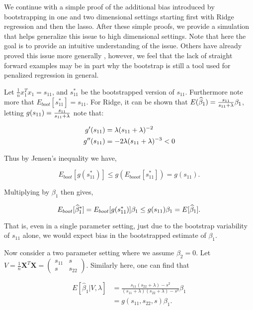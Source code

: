 We continue with a simple proof of the additional bias introduced by bootstrapping in one and two dimensional settings starting first with Ridge regression and then the lasso. After these simple proofs, we provide a simulation that helps generalize this issue to high dimensional settings. Note that here the goal is to provide an intuitive understanding of the issue. Others have already proved this issue more generally \citep{karoui2016, clarté2024}, however, we feel that the lack of straight forward examples may be in part why the bootstrap is still a tool used for penalized regression in general.

Let $\frac{1}{n}x_1^Tx_1 = s_{11}$, and $s_{11}^*$ be the bootstrapped version of $s_{11}$. Furthermore note more that $E_{boot}[s_{11}^*] = s_{11}$. For Ridge, it can be shown that $E(\widehat{\beta}_1) = \frac{s_{11}}{s_{11} + \lambda}\beta_1$, letting $g(s_{11}) = \frac{s_{11}}{s_{11} + \lambda}$ note that:

$$
\begin{aligned}
g'(s_{11}) &= \lambda (s_{11} + \lambda)^{-2} \\
g''(s_{11}) &= -2\lambda (s_{11} + \lambda)^{-3} < 0
\end{aligned}
$$

\noindent Thus by Jensen's inequality we have,

$$
E_{boot}[g(s_{11}^*)] \leq g(E_{booot}[s_{11}^*]) = g(s_11).
$$

\noindent Multiplying by $\beta_1$ then gives,

$$
E_{boot}[\widehat{\beta}_1^*] = E_{boot}[g(s_{11}^*)]\beta_1 \leq g(s_{11})\beta_1 = E[\widehat{\beta}_1].
$$

\noindent That is, even in a single parameter setting, just due to the bootstrap variability of $s_{11}$ alone, we would expect bias in the bootstrapped estimate of $\beta_1$.

Now consider a two parameter setting where we assume $\beta_2 = 0$. Let $V = \frac{1}{n}\boldsymbol{X}^T\boldsymbol{X} = \begin{pmatrix} s_{11} & s \\ s & s_{22} \end{pmatrix}$. Similarly here, one can find that

$$
\begin{aligned}
E[\hat{\beta}_1 | V, \lambda] &= \frac{s_{11}(s_{22} + \lambda) - s^2}{(s_{11} + \lambda)(s_{22} + \lambda) - s^2} \beta_1 \\
&= g(s_{11}, s_{22}, s)\beta_1.
\end{aligned}
$$

